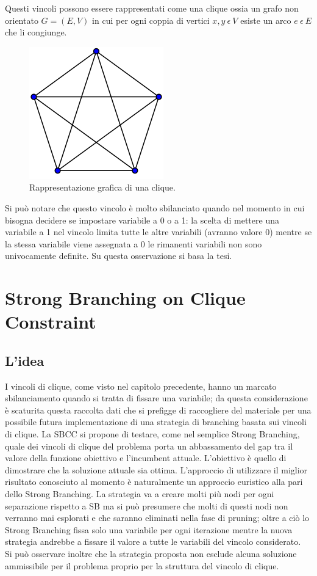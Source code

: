 \documentclass[12pt,a4paper,twoside,openright]{book}
\begin{document}
Questi vincoli possono essere rappresentati come una clique ossia un grafo 
non orientato $G = (E, V)$ in cui per ogni coppia di vertici $x,y\:\epsilon\:V$ esiste 
un arco $e\:\epsilon\:E$ che li congiunge.
\begin{figure}[ht]
    \centering
    \includegraphics [scale = 0.5]{cricca.png}
    \caption{Rappresentazione grafica di una clique. }
    \label{fig:cricca}
\end{figure}
Si può notare che questo vincolo è molto sbilanciato quando nel momento in cui bisogna decidere se impostare
variabile a 0 o a 1: la scelta di mettere una variabile a 1 nel vincolo limita tutte le 
altre variabili (avranno valore 0) mentre se la stessa variabile viene assegnata a 0 le rimanenti variabili 
non sono univocamente definite. Su questa osservazione si basa la tesi.

\chapter{Strong Branching on Clique Constraint}
\section{L'idea}
I vincoli di clique, come visto nel capitolo precedente, hanno un marcato sbilanciamento quando si 
tratta di fissare una variabile; da questa considerazione è scaturita questa raccolta dati  
che si prefigge di raccogliere del materiale per una possibile futura implementazione di una 
strategia di branching basata sui vincoli di clique. La SBCC si propone di testare, come nel semplice Strong Branching,
quale dei vincoli di clique del problema porta un abbassamento del gap tra il valore della funzione obiettivo e
l'incumbent attuale. L'obiettivo è quello di dimostrare che la soluzione attuale sia ottima.
L'approccio di utilizzare il miglior risultato conosciuto al momento è naturalmente un approccio
euristico alla pari dello Strong Branching.
La strategia va a creare molti più nodi per ogni separazione rispetto a SB ma si può presumere che 
molti di questi nodi non verranno mai esplorati e che saranno eliminati nella fase di pruning; oltre a ciò
lo Strong Branching fissa solo una variabile per ogni iterazione mentre la nuova strategia andrebbe a fissare 
il valore a tutte le variabili del vincolo considerato. \\
Si può osservare inoltre che la strategia proposta non esclude alcuna soluzione ammissibile per il
problema proprio per la struttura del vincolo di clique.\clearpage
\end{document}
